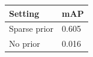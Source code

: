 \begin{tabular}{ll}
\toprule
Setting & mAP \\
\midrule
Sparse prior & 0.605 \\
No prior & 0.016 \\
\bottomrule
\end{tabular}
